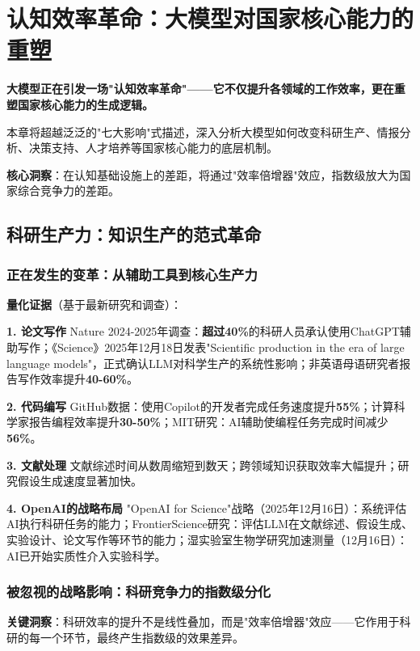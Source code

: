 \chapter{认知效率革命：大模型对国家核心能力的重塑}

\textbf{大模型正在引发一场"认知效率革命"——它不仅提升各领域的工作效率，更在重塑国家核心能力的生成逻辑。}

本章将超越泛泛的"七大影响"式描述，深入分析大模型如何改变科研生产、情报分析、决策支持、人才培养等国家核心能力的底层机制。

\textbf{核心洞察}：在认知基础设施上的差距，将通过"效率倍增器"效应，指数级放大为国家综合竞争力的差距。

\section{科研生产力：知识生产的范式革命}

\subsection{正在发生的变革：从辅助工具到核心生产力}

\textbf{量化证据}（基于最新研究和调查）：

\textbf{1. 论文写作}
Nature 2024-2025年调查：\textbf{超过40\%}的科研人员承认使用ChatGPT辅助写作；《Science》2025年12月18日发表"Scientific production in the era of large language models"，正式确认LLM对科学生产的系统性影响；非英语母语研究者报告写作效率提升\textbf{40-60\%}。

\textbf{2. 代码编写}
GitHub数据：使用Copilot的开发者完成任务速度提升\textbf{55\%}；计算科学家报告编程效率提升\textbf{30-50\%}；MIT研究：AI辅助使编程任务完成时间减少\textbf{56\%}。

\textbf{3. 文献处理}
文献综述时间从数周缩短到数天；跨领域知识获取效率大幅提升；研究假设生成速度显著加快。

\textbf{4. OpenAI的战略布局}
"OpenAI for Science"战略（2025年12月16日）：系统评估AI执行科研任务的能力；FrontierScience研究：评估LLM在文献综述、假设生成、实验设计、论文写作等环节的能力；湿实验室生物学研究加速测量（12月16日）：AI已开始实质性介入实验科学。

\subsection{被忽视的战略影响：科研竞争力的指数级分化}

\textbf{关键洞察}：科研效率的提升不是线性叠加，而是"效率倍增器"效应——它作用于科研的每一个环节，最终产生指数级的效果差异。

